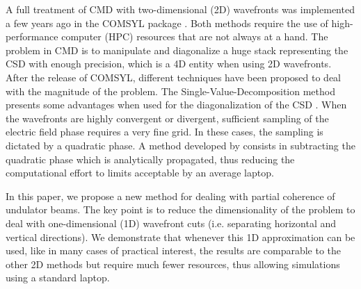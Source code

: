\documentclass{iucr}
\newcommand{\inred}[1]{{\color{red}#1}}
\begin{document}
A full treatment of CMD with two-dimensional (2D) wavefronts was implemented a few years ago in the COMSYL package \cite{codeCOMSYL}. Both methods require the use of high-performance computer (HPC) resources that are not always at a hand.
The problem in CMD is to manipulate and diagonalize a huge stack representing the CSD with enough precision, which is a 4D entity when using 2D wavefronts. 
After the release of COMSYL, different techniques have been proposed to deal with the magnitude of the problem. The Single-Value-Decomposition method presents some advantages when used for the diagonalization of the CSD \cite{SVDHanXu}. When the wavefronts are highly convergent or divergent,  sufficient sampling of the electric field phase requires a very fine grid. In these cases, the sampling is dictated by a quadratic phase. A method developed by  consists in subtracting the quadratic phase which is analytically propagated, thus reducing the computational effort to limits acceptable by an average laptop.


In this paper, we propose a new method for dealing with partial coherence of undulator beams. The key point is to reduce the dimensionality of the problem to deal with one-dimensional (1D) wavefront cuts (i.e. separating horizontal and vertical directions). 
We demonstrate that whenever this 1D approximation can be used, like in many cases of practical interest, the results are comparable to the other 2D methods but require much fewer resources, thus allowing simulations using a standard laptop. 
\end{document}
